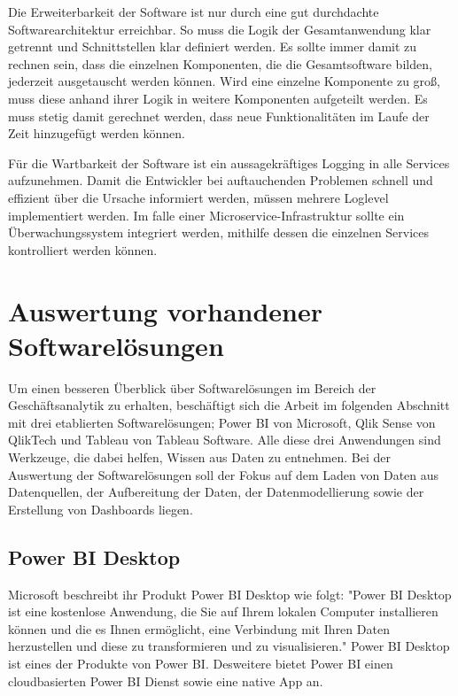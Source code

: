 Die Erweiterbarkeit der Software ist nur durch eine gut durchdachte Softwarearchitektur erreichbar.
So muss die Logik der Gesamtanwendung klar getrennt und Schnittstellen klar definiert werden. Es sollte
immer damit zu rechnen sein, dass die einzelnen Komponenten, die die Gesamtsoftware bilden, jederzeit
ausgetauscht werden können. Wird eine einzelne Komponente zu groß, muss diese anhand ihrer Logik in weitere
Komponenten aufgeteilt werden. Es muss stetig damit gerechnet werden, dass neue Funktionalitäten im
Laufe der Zeit hinzugefügt werden können.

Für die Wartbarkeit der Software ist ein aussagekräftiges Logging in alle Services aufzunehmen.
Damit die Entwickler bei auftauchenden Problemen schnell und effizient über die Ursache informiert werden,
müssen mehrere Loglevel implementiert werden. Im falle einer Microservice-Infrastruktur sollte ein Überwachungssystem
integriert werden, mithilfe dessen die einzelnen Services kontrolliert werden können.

\section{Auswertung vorhandener Softwarelösungen}
\label{sec:auswertungvorhandenersoftwareloesungen}
Um einen besseren Überblick über Softwarelösungen im Bereich der Geschäftsanalytik zu erhalten, beschäftigt sich
die Arbeit im folgenden Abschnitt mit drei etablierten Softwarelösungen; Power BI von
Microsoft, Qlik Sense von QlikTech und Tableau von Tableau Software. Alle diese drei Anwendungen sind Werkzeuge,
die dabei helfen, Wissen aus Daten zu entnehmen. Bei der Auswertung der Softwarelösungen soll der Fokus auf dem Laden
von Daten aus Datenquellen, der Aufbereitung der Daten, der Datenmodellierung sowie der Erstellung von Dashboards liegen.

\subsection{Power BI Desktop}
\label{subsec:powerbidesktop}
Microsoft beschreibt ihr Produkt Power BI Desktop wie folgt: "Power BI Desktop ist eine kostenlose Anwendung,
die Sie auf Ihrem lokalen Computer installieren können und die es Ihnen ermöglicht, eine Verbindung mit Ihren
Daten herzustellen und diese zu transformieren und zu visualisieren."\cite{MicrosoftPowerBIDesktopDocs}
Power BI Desktop ist eines der Produkte von Power BI. Desweitere bietet Power BI einen cloudbasierten Power BI Dienst
sowie eine native App an.\cite{WikiPowerBI}

